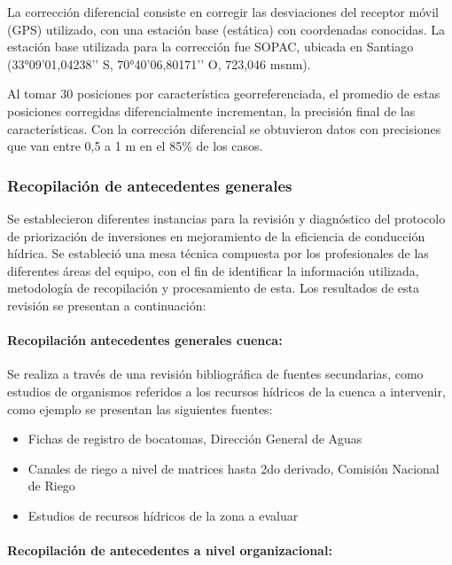 \documentclass[]{article}
\begin{document}
La corrección diferencial consiste en corregir las desviaciones del receptor móvil (GPS) utilizado, con una estación base (estática) con coordenadas conocidas. La estación base utilizada para la corrección fue SOPAC, ubicada en Santiago (33°09’01,04238’’ S, 70°40’06,80171’’ O, 723,046 msnm).

Al tomar 30 posiciones por característica georreferenciada, el promedio de estas posiciones corregidas diferencialmente incrementan, la precisión final de las características. Con la corrección diferencial se obtuvieron datos con precisiones que van entre 0,5 a 1 m en el 85\% de los casos. 





\subsubsection{Recopilación de antecedentes generales}

Se establecieron diferentes instancias para la revisión y diagnóstico del protocolo de priorización de inversiones en mejoramiento de la eficiencia de conducción hídrica. Se estableció una mesa técnica compuesta por los profesionales de las diferentes áreas del equipo, con el fin de identificar la información utilizada, metodología de recopilación y procesamiento de esta. Los resultados de esta revisión se presentan a continuación:

\paragraph{Recopilación antecedentes generales cuenca:}

Se realiza a través de una revisión bibliográfica de fuentes secundarias, como estudios de organismos referidos a los recursos hídricos de la cuenca a intervenir, como ejemplo se presentan las siguientes fuentes:

\begin{itemize}
\item Fichas de registro de bocatomas, Dirección General de Aguas
\item Canales de riego a nivel de matrices hasta 2do derivado, Comisión Nacional de Riego
\item Estudios de recursos hídricos de la zona a evaluar
\end{itemize}

\paragraph{Recopilación de antecedentes a nivel organizacional:}
\end{document}
